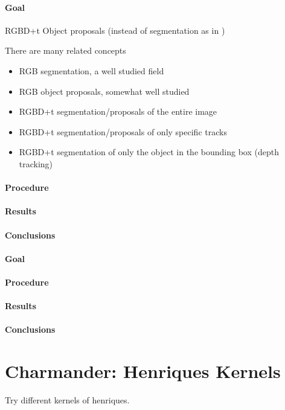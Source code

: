 \paragraph{Goal} RGBD+t Object proposals (instead of segmentation as in \cite{hickson2014efficient})

There are many related concepts
\begin{itemize}
\item RGB segmentation, a well studied field
\item RGB object proposals, somewhat well studied
\item RGBD+t segmentation/proposals of the entire image
\item RGBD+t segmentation/proposals of only specific tracks
\item RGBD+t segmentation of only the object in the bounding box (depth tracking)
\end{itemize}
\paragraph{Procedure}
\paragraph{Results}
\paragraph{Conclusions}

\label{exp:Venusaur}
\paragraph{Goal}
\paragraph{Procedure}
\paragraph{Results}
\paragraph{Conclusions}
\section{Charmander: Henriques Kernels}
\label{exp:Charmander}
Try different kernels of henriques.

